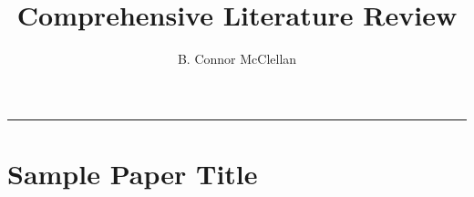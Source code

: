 \documentclass[onecolumn]{aastex63}
\begin{document}
\title{Comprehensive Literature Review}
\author{B. Connor McClellan}
\keywords{}

\tableofcontents

\vspace{1cm}
\hrule
\vspace{1cm}

\section{Sample Paper Title}
\begin{centering}

\cite{sample2020}

\end{centering}






\end{document}
